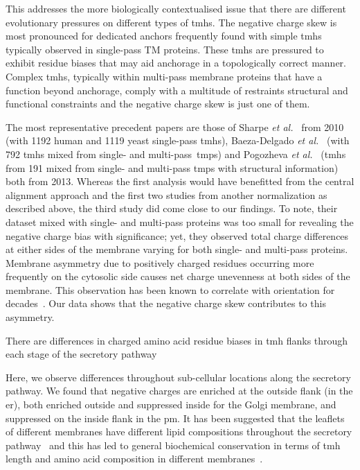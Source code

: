 \begin{enumerate}[i]
 This addresses the more biologically contextualised issue that there are different evolutionary pressures on different types of \gls{tmh}s.
The negative charge skew is most pronounced for dedicated anchors frequently found with simple \gls{tmh}s typically observed in single-pass TM proteins.
These \gls{tmh}s are pressured to exhibit residue biases that may aid anchorage in a topologically correct manner.
Complex \gls{tmh}s, typically within multi-pass membrane proteins that have a function beyond anchorage, comply with a multitude of restraints structural and functional constraints and the negative charge skew is just one of them.
\end{enumerate}

The most representative precedent papers are those of Sharpe \textit{et al.}~\cite{Sharpe2010} from 2010 (with 1192 human and 1119 yeast single-pass \gls{tmh}s), Baeza-Delgado \textit{et al.}~\cite{Baeza-Delgado2013} (with 792 \gls{tmh}s mixed from single- and multi-pass~\gls{tmp}s) and Pogozheva \textit{et al.}~\cite{Pogozheva2013} (\gls{tmh}s from 191 mixed from single- and multi-pass \gls{tmp}s with structural information) both from 2013.
Whereas the first analysis would have benefitted from the central alignment approach and the first two studies from another normalization as described above, the third study did come close to our findings.
To note, their dataset mixed with single- and multi-pass proteins was too small for revealing the negative charge bias with significance; yet, they observed total charge differences at either sides of the membrane varying for both single- and multi-pass proteins.
Membrane asymmetry due to positively charged residues occurring more frequently on the cytosolic side causes net charge unevenness at both sides of the membrane.
This observation has been known to correlate with orientation for decades~\cite{VonHeijne1989, Baeza-Delgado2013, Meindl-Beinker2006}.
Our data shows that the negative charge skew contributes to this asymmetry.

There are differences in charged amino acid residue biases in \gls{tmh} flanks through each stage of the secretory pathway

Here, we observe differences throughout sub-cellular locations along the secretory pathway.
We found that negative charges are enriched at the outside flank (in the \gls{er}), both enriched outside and suppressed inside for the Golgi membrane, and suppressed on the inside flank in the \gls{pm}.
It has been suggested that the leaflets of different membranes have different lipid compositions throughout the secretory pathway~\cite{VanMeer2008} and this has led to general biochemical conservation in terms of \gls{tmh} length and amino acid composition in different membranes~\cite{Sharpe2010, Pogozheva2013}.

